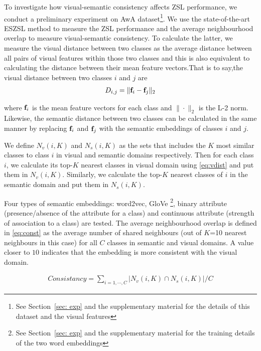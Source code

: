 \documentclass{bmvc2k}
\begin{document}
To investigate how visual-semantic consistency affects ZSL performance, we conduct a preliminary experiment on AwA dataset\footnote{See Section~\ref{sec: exp} and the supplementary material for the details of this dataset and the visual features}. We use the state-of-the-art ESZSL \cite{Romera2015ZSL} method to measure the ZSL performance and the average neighbourhood overlap to measure visual-semantic consistency. To calculate the latter, we measure the visual distance between two classes as the average distance between all pairs of visual features within those two classes and this is also equivalent to calculating the distance between their mean feature vectors.That is to say,the visual distance between two classes $i$ and $j$ are
\begin{align}\label{eq:vdist}
 D_{i,j} = \|{\bf f}_i - {\bf f}_j \|_2
\end{align}

where ${\bf f}_i$ is the mean feature vectors for each class and $\|\cdot \|_2$ is the L-2 norm. Likewise, the semantic distance between two classes can be calculated in the same manner by replacing ${\bf f}_i$ and ${\bf f}_j$ with the semantic embeddings of classes $i$ and $j$.

We define $N_v(i, K)$ and $N_s(i, K)$ as the sets that includes the $K$ most similar classes to class $i$ in visual and semantic domains respectively.
Then for each class $i$, we calculate its top-$K$ nearest classes in visual domain using \eqref{eq:vdist} and put them in $N_v(i, K)$. Similarly, we calculate the top-$K$ nearest classes of $i$ in the semantic domain and put them in $N_s(i, K)$.

Four types of semantic embeddings: word2vec, GloVe \footnote{See Section~\ref{sec: exp} and the supplementary material for the training details of the two word embeddings}, binary attribute (presence/absence of the attribute for a class) and continuous attribute (strength of association to a class) are tested. The average neighbourhood overlap is defined in \eqref{eq:const} as the average number of shared neighbours (out of $K$=10 nearest neighbours in this case) for all $C$ classes in semantic and visual domains. A value closer to $10$ indicates that the embedding is more consistent with the visual domain.

\begin{align}\label{eq:const}
 Consistancy = \sum_{i=1, \cdots, C} {|N_v(i, K) \cap N_s(i, K) |} / C
\end{align}
\end{document}
